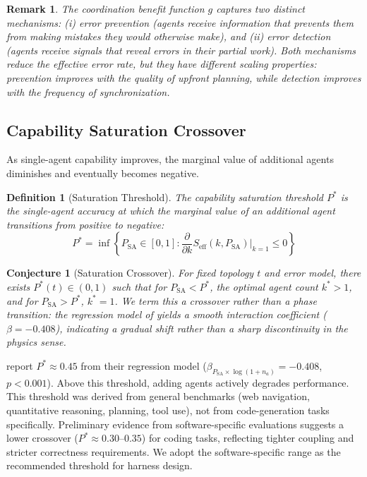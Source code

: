 \documentclass[11pt, a4paper]{googledeepmind}
\newtheorem{definition}{Definition}[section]
\newtheorem{conjecture}{Conjecture}[section]
\newtheorem*{remark}{Remark}
\begin{document}
\begin{remark}
The coordination benefit function $g$ captures two distinct mechanisms: (i) error prevention (agents receive information that prevents them from making mistakes they would otherwise make), and (ii) error detection (agents receive signals that reveal errors in their partial work). Both mechanisms reduce the effective error rate, but they have different scaling properties: prevention improves with the quality of upfront planning, while detection improves with the frequency of synchronization.
\end{remark}

\subsection{Capability Saturation Crossover}

As single-agent capability improves, the marginal value of additional agents diminishes and eventually becomes negative.

\begin{definition}[Saturation Threshold]
\label{def:saturation}
The capability saturation threshold $P^*$ is the single-agent accuracy at which the marginal value of an additional agent transitions from positive to negative:
\begin{equation}
    P^* = \inf \left\{ P_{\mathrm{SA}} \in [0,1] : \frac{\partial}{\partial k} S_{\mathrm{eff}}(k, P_{\mathrm{SA}}) \Big|_{k=1} \leq 0 \right\}
\end{equation}
\end{definition}

\begin{conjecture}[Saturation Crossover]
\label{conj:phase}
For fixed topology $t$ and error model, there exists $P^*(t) \in (0,1)$ such that for $P_{\mathrm{SA}} < P^*$, the optimal agent count $k^* > 1$, and for $P_{\mathrm{SA}} > P^*$, $k^* = 1$. We term this a crossover rather than a phase transition: the regression model of \citet{kim2025scaling} yields a smooth interaction coefficient ($\beta = -0.408$), indicating a gradual shift rather than a sharp discontinuity in the physics sense.
\end{conjecture}

\citet{kim2025scaling} report $P^* \approx 0.45$ from their regression model ($\beta_{P_{\mathrm{SA}} \times \log(1+n_a)} = -0.408$, $p < 0.001$). Above this threshold, adding agents actively degrades performance. This threshold was derived from general benchmarks (web navigation, quantitative reasoning, planning, tool use), not from code-generation tasks specifically. Preliminary evidence from software-specific evaluations suggests a lower crossover ($P^* \approx 0.30$--$0.35$) for coding tasks, reflecting tighter coupling and stricter correctness requirements. We adopt the software-specific range as the recommended threshold for harness design.
\end{document}
